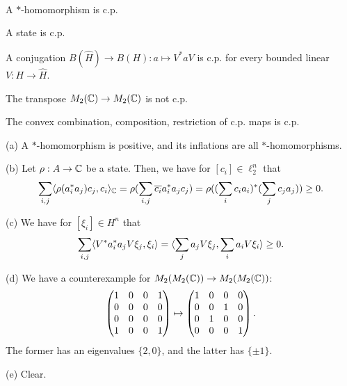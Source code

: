 \documentclass{../../../small}
\begin{document}
\begin{ex}\,
\begin{parts}
\item A $*$-homomorphism is c.p.
\item A state is c.p.
\item A conjugation $B(\hat H)\to B(H):a\mapsto V^*aV$ is c.p. for every bounded linear $V:H\to\hat H$.
\item The transpose $M_2(\mathbb{C})\to M_2(\mathbb{C})$ is not c.p.
\item The convex combination, composition, restriction of c.p. maps is c.p.
\end{parts}
\end{ex}
\begin{pf}
(a)
A $*$-homomorphism is positive, and its inflations are all $*$-homomorphisms.

(b)
Let $\rho:A\to\mathbb{C}$ be a state.
Then, we have for $[c_i]\in\ell_2^n$ that
\[\sum_{i,j}\langle\rho(a_i^*a_j)c_j,c_i\rangle_{\mathbb{C}}
=\rho(\sum_{i,j}\overline{c_i}a_i^*a_jc_j)
=\rho((\sum_ic_ia_i)^*(\sum_jc_ja_j))\ge0.\]

(c)
We have for $[\xi_i]\in H^n$ that
\[\sum_{i,j}\langle V^*a_i^*a_jV\xi_j,\xi_i\rangle
=\langle\sum_ja_jV\xi_j,\sum_ia_iV\xi_i\rangle\ge0.\]

(d)
We have a counterexample for $M_2(M_2(\mathbb{C}))\to M_2(M_2(\mathbb{C}))$:
\[\begin{pmatrix}1&0&0&1\\0&0&0&0\\0&0&0&0\\1&0&0&1\end{pmatrix}\mapsto\begin{pmatrix}1&0&0&0\\0&0&1&0\\0&1&0&0\\0&0&0&1\end{pmatrix}.\]
The former has an eigenvalues $\{2,0\}$, and the latter has $\{\pm1\}$.

(e) Clear.
\end{pf}
\end{document}
